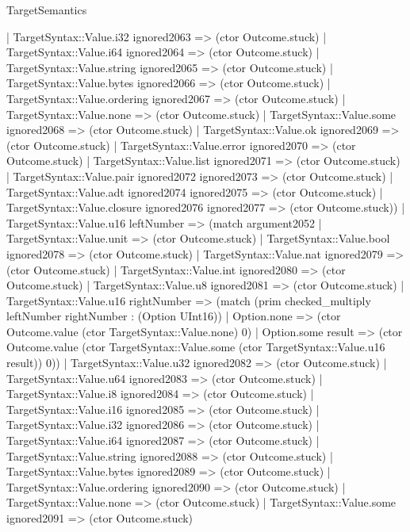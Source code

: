 \begin{lexlean}{TargetSemantics}
\begin{semanticmodule}
{              | TargetSyntax::Value.i32 ignored2063 => (ctor Outcome.stuck)
              | TargetSyntax::Value.i64 ignored2064 => (ctor Outcome.stuck)
              | TargetSyntax::Value.string ignored2065 => (ctor Outcome.stuck)
              | TargetSyntax::Value.bytes ignored2066 => (ctor Outcome.stuck)
              | TargetSyntax::Value.ordering ignored2067 => (ctor Outcome.stuck)
              | TargetSyntax::Value.none => (ctor Outcome.stuck)
              | TargetSyntax::Value.some ignored2068 => (ctor Outcome.stuck)
              | TargetSyntax::Value.ok ignored2069 => (ctor Outcome.stuck)
              | TargetSyntax::Value.error ignored2070 => (ctor Outcome.stuck)
              | TargetSyntax::Value.list ignored2071 => (ctor Outcome.stuck)
              | TargetSyntax::Value.pair ignored2072 ignored2073 => (ctor Outcome.stuck)
              | TargetSyntax::Value.adt ignored2074 ignored2075 => (ctor Outcome.stuck)
              | TargetSyntax::Value.closure ignored2076 ignored2077 => (ctor Outcome.stuck))
            | TargetSyntax::Value.u16 leftNumber => (match argument2052
              | TargetSyntax::Value.unit => (ctor Outcome.stuck)
              | TargetSyntax::Value.bool ignored2078 => (ctor Outcome.stuck)
              | TargetSyntax::Value.nat ignored2079 => (ctor Outcome.stuck)
              | TargetSyntax::Value.int ignored2080 => (ctor Outcome.stuck)
              | TargetSyntax::Value.u8 ignored2081 => (ctor Outcome.stuck)
              | TargetSyntax::Value.u16 rightNumber => (match (prim checked_multiply leftNumber rightNumber : (Option UInt16))
                | Option.none => (ctor Outcome.value (ctor TargetSyntax::Value.none) 0)
                | Option.some result => (ctor Outcome.value (ctor TargetSyntax::Value.some (ctor TargetSyntax::Value.u16 result)) 0))
              | TargetSyntax::Value.u32 ignored2082 => (ctor Outcome.stuck)
              | TargetSyntax::Value.u64 ignored2083 => (ctor Outcome.stuck)
              | TargetSyntax::Value.i8 ignored2084 => (ctor Outcome.stuck)
              | TargetSyntax::Value.i16 ignored2085 => (ctor Outcome.stuck)
              | TargetSyntax::Value.i32 ignored2086 => (ctor Outcome.stuck)
              | TargetSyntax::Value.i64 ignored2087 => (ctor Outcome.stuck)
              | TargetSyntax::Value.string ignored2088 => (ctor Outcome.stuck)
              | TargetSyntax::Value.bytes ignored2089 => (ctor Outcome.stuck)
              | TargetSyntax::Value.ordering ignored2090 => (ctor Outcome.stuck)
              | TargetSyntax::Value.none => (ctor Outcome.stuck)
              | TargetSyntax::Value.some ignored2091 => (ctor Outcome.stuck)
}
\end{semanticmodule}
\end{lexlean}
